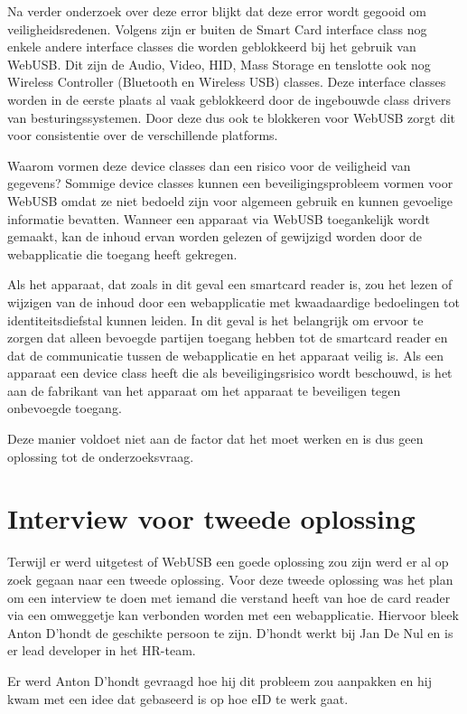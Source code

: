 Na verder onderzoek over deze error blijkt dat deze error wordt gegooid om veiligheidsredenen. Volgens \textcite{ReillyGrant} zijn er buiten de Smart Card interface class nog enkele andere interface classes die worden geblokkeerd bij het gebruik van WebUSB. Dit zijn de Audio, Video, HID, Mass Storage en tenslotte ook nog Wireless Controller (Bluetooth en Wireless USB) classes. Deze interface classes worden in de eerste plaats al vaak geblokkeerd door de ingebouwde class drivers van besturingssystemen. Door deze dus ook te blokkeren voor WebUSB zorgt dit voor consistentie over de verschillende platforms. 

Waarom vormen deze device classes dan een risico voor de veiligheid van gegevens? Sommige device classes kunnen een beveiligingsprobleem vormen voor WebUSB omdat ze niet bedoeld zijn voor algemeen gebruik en kunnen gevoelige informatie bevatten. Wanneer een apparaat via WebUSB toegankelijk wordt gemaakt, kan de inhoud ervan worden gelezen of gewijzigd worden door de webapplicatie die toegang heeft gekregen. 

Als het apparaat, dat zoals in dit geval een smartcard reader is, zou het lezen of wijzigen van de inhoud door een webapplicatie met kwaadaardige bedoelingen tot identiteitsdiefstal kunnen leiden. In dit geval is het belangrijk om ervoor te zorgen dat alleen bevoegde partijen toegang hebben tot de smartcard reader en dat de communicatie tussen de webapplicatie en het apparaat veilig is. Als een apparaat een device class heeft die als beveiligingsrisico wordt beschouwd, is het aan de fabrikant van het apparaat om het apparaat te beveiligen tegen onbevoegde toegang.

Deze manier voldoet niet aan de factor dat het moet werken en is dus geen oplossing tot de onderzoeksvraag.




\section{Interview voor tweede oplossing}
Terwijl er werd uitgetest of WebUSB een goede oplossing zou zijn werd er al op zoek gegaan naar een tweede oplossing. Voor deze tweede oplossing was het plan om een interview te doen met iemand die verstand heeft van hoe de card reader via een omweggetje kan verbonden worden met een webapplicatie. Hiervoor bleek Anton D’hondt de geschikte persoon te zijn. D'hondt werkt bij Jan De Nul en is er lead developer in het HR-team. 

Er werd Anton D'hondt gevraagd hoe hij dit probleem zou aanpakken en hij kwam met een idee dat gebaseerd is op hoe eID te werk gaat. 

